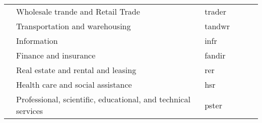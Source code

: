 \begin{table}
{\begin{tabular}{c|p{11.215em}|p{6.645em}|p{6.93em}|c|c}
            \cline{2-3}                                                   & Wholesale trande and Retail Trade                             & trader                                    & \multicolumn{1}{c|}{}                                   &                                                                          &                                                     \\
            \cline{2-3}                                                   & Transportation and warehousing                                & tandwr                                    & \multicolumn{1}{c|}{}                                   &                                                                          &                                                     \\
            \cline{2-3}                                                   & Information                                                   & infr                                      & \multicolumn{1}{c|}{}                                   &                                                                          &                                                     \\
            \cline{2-3}                                                   & Finance and insurance                                         & fandir                                    & \multicolumn{1}{c|}{}                                   &                                                                          &                                                     \\
            \cline{2-3}                                                   & Real estate and rental and leasing                            & rer                                       & \multicolumn{1}{c|}{}                                   &                                                                          &                                                     \\
            \cline{2-3}                                                   & Health care and social assistance                             & hsr                                       & \multicolumn{1}{c|}{}                                   &                                                                          &                                                     \\
            \cline{2-3}                                                   & Professional, scientific, educational, and technical services & pster                                     & \multicolumn{1}{c|}{}                                   &                                                                          &                                                     \\

\end{tabular}}
\end{table}
